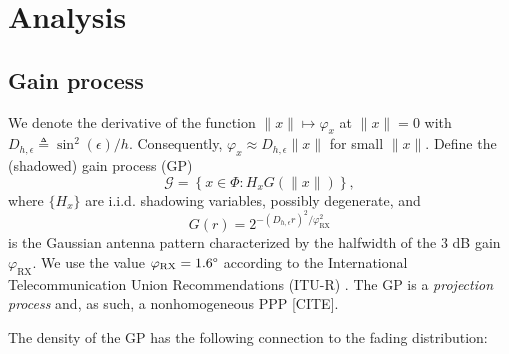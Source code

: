 \documentclass[conference]{IEEEtran}
\theoremstyle{definition}
\theoremstyle{plain}
\begin{document}
      
          \section{Analysis}

          \subsection{Gain process}
          We denote the derivative of the function $\|x\| \mapsto \varphi_x $ at $\|x\| =0$ with $D_{h,\epsilon} \triangleq \sin^2(\epsilon)/h$. Consequently, $\varphi_x \approx D_{h,\epsilon}\|x\|$ for small $\|x\|$.
          Define the (shadowed) gain process (GP)
          \begin{equation}
            \mathcal{G} = \left\{x \in \Phi : H_x G(\|x\|) \right\},
          \end{equation}
          where $\{H_x\}$ are i.i.d. shadowing variables, possibly degenerate, and 
          \begin{equation}
            G(r) = 2^{-(D_{h,\epsilon}r)^2/\varphi^2_{\text{RX}}}
          \end{equation}
          is the Gaussian antenna pattern characterized by the halfwidth of the $3$ dB gain $\varphi_{\text{RX}}$. We use the value $\varphi_{\text{RX}} = 1.6 \degree$ according to the International Telecommunication Union Recommendations (ITU-R) \cite{ITURS1528}. The GP is a \textit{projection process} and, as such, a nonhomogeneous PPP [CITE].

            The density of the GP has the following connection to the fading distribution:
\end{document}
